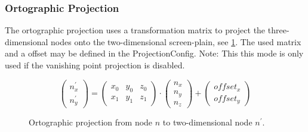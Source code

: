 \subsubsection{Ortographic Projection}
The ortographic projection uses a transformation matrix to project the three-dimensional nodes onto the two-dimensional screen-plain, see \ref{math:orthographicProjection}. The used matrix and a offset may be defined in the ProjectionConfig. Note: This this mode is only used if the vanishing point projection is disabled.

\begin{figure} [h]
\[
\left(
\begin{array}{c}
n_{x}^{'} \\
n_{y}^{'}
\end{array}
\right)
%
=
%
\left(
\begin{array}{ccc}
x_0 & y_0 & z_0 \\
x_1 & y_1 & z_1
\end{array}
\right)
\cdot
\left(
\begin{array}{c}
n_x  \\
n_y  \\
n_z
\end{array}
\right)
%
+
%
\left(
\begin{array}{c}
offset_x \\
offset_y
\end{array}
\right)
\]
\caption{Ortographic projection from node $n$ to two-dimensional node $n^{'}$.}
\label{math:orthographicProjection}
\end{figure}

